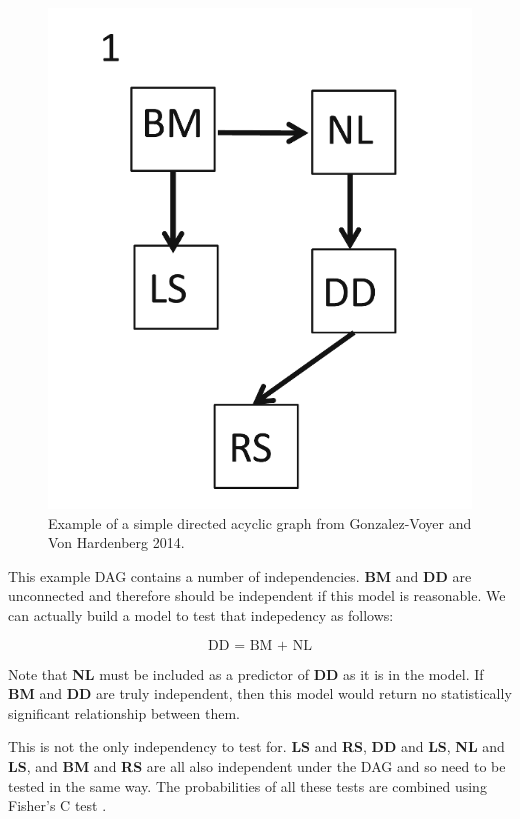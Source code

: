\documentclass[
]{book}
\begin{document}
\begin{figure}[H]

{\centering \includegraphics[width=7.94in]{Images/DAG1} 

}

\caption{Example of a simple directed acyclic graph from Gonzalez-Voyer and Von Hardenberg 2014.}\label{fig:unnamed-chunk-298}
\end{figure}

This example DAG contains a number of independencies. \textbf{BM} and \textbf{DD} are unconnected and therefore should be independent if this model is reasonable. We can actually build a model to test that indepedency as follows:

\[ \text{DD = BM + NL}\]

Note that \textbf{NL} must be included as a predictor of \textbf{DD} as it is in the model. If \textbf{BM} and \textbf{DD} are truly independent, then this model would return no statistically significant relationship between them.

This is not the only independency to test for. \textbf{LS} and \textbf{RS}, \textbf{DD} and \textbf{LS}, \textbf{NL} and \textbf{LS}, and \textbf{BM} and \textbf{RS} are all also independent under the DAG and so need to be tested in the same way. The probabilities of all these tests are combined using Fisher's C test \citep{Shipley16}.
\end{document}
